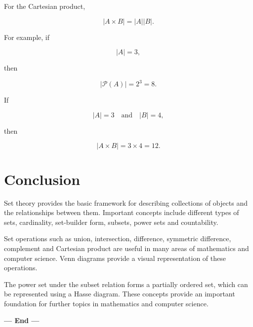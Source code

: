 \documentclass[12pt,a4paper]{article}
\begin{document}
For the Cartesian product,

\[
|A\times B|=|A||B|.
\]

For example, if

\[
|A|=3,
\]

then

\[
|\mathcal{P}(A)|=2^3=8.
\]

If

\[
|A|=3
\quad\text{and}\quad
|B|=4,
\]

then

\[
|A\times B|=3\times4=12.
\]


\section{Conclusion}

Set theory provides the basic framework for describing collections of
objects and the relationships between them. Important concepts include
different types of sets, cardinality, set-builder form, subsets, power
sets and countability.

Set operations such as union, intersection, difference, symmetric
difference, complement and Cartesian product are useful in many areas
of mathematics and computer science. Venn diagrams provide a visual
representation of these operations.

The power set under the subset relation forms a partially ordered set,
which can be represented using a Hasse diagram. These concepts provide
an important foundation for further topics in mathematics and computer
science.

\vspace{1cm}

\begin{center}
\textbf{--- End ---}
\end{center}
\end{document}
